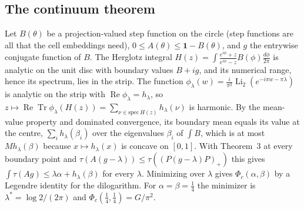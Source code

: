 \documentclass[11pt]{article}
\newcommand{\Tr}{\operatorname{Tr}}
\newcommand{\one}{\mathbf{1}}
\newcommand{\Li}{\operatorname{Li}_2}
\renewcommand{\Re}{\operatorname{Re}}
\begin{document}
\subsection*{The continuum theorem}
Let $B(\theta)$ be a projection-valued step function on the circle (step functions are all that the cell embeddings
need), $0\le A(\theta)\le\one-B(\theta)$, and $g$ the entrywise conjugate function of $B$. The Herglotz integral $H(z)=\int\frac{e^{i\phi}+z}{e^{i\phi}-z}B(\phi)\frac{d\phi}{2\pi}$
is analytic on the unit disc with boundary values $B+ig$, and its numerical range, hence its spectrum, lies in the strip.
The function $\phi_\lambda(w)=\frac{i}{\pi^2}\Li(e^{-i\pi w-\pi\lambda})$ is analytic on the strip with
$\Re\phi_\lambda=h_\lambda$, so $z\mapsto\Re\Tr\phi_\lambda(H(z))=\sum_{\nu\in\mathrm{spec}\,H(z)}h_\lambda(\nu)$ is
harmonic. By the mean-value property and dominated convergence, its boundary mean equals its value at the centre,
$\sum_ih_\lambda(\beta_i)$ over the eigenvalues $\beta_i$ of $\int B$, which is at most $Mh_\lambda(\beta)$ because
$x\mapsto h_\lambda(x)$ is concave on $[0,1]$. With Theorem~3 at
every boundary point and $\tau(A(g-\lambda))\le\tau((P(g-\lambda)P)_+)$ this gives
$\int\tau(Ag)\le\lambda\alpha+h_\lambda(\beta)$ for every $\lambda$. Minimizing over $\lambda$ gives $\Phi_c(\alpha,\beta)$
by a Legendre identity for the dilogarithm. For $\alpha=\beta=\frac14$ the minimizer is $\lambda^*=\log2/(2\pi)$ and
$\Phi_c(\frac14,\frac14)=G/\pi^2$.
\end{document}
